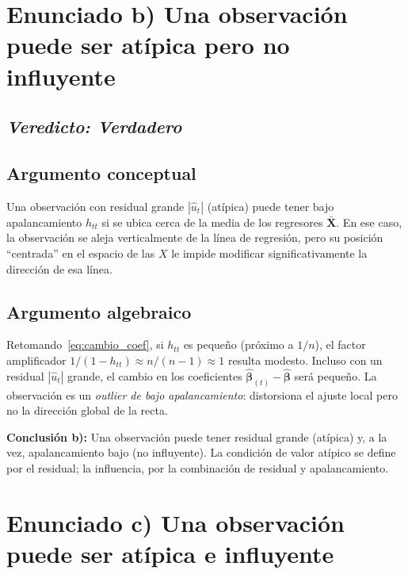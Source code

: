 \documentclass[12pt, letterpaper]{article}
\begin{document}
\section{Enunciado b) Una observación puede ser atípica pero no influyente}

\subsection*{\textit{Veredicto: \textbf{Verdadero}}}

\subsection{Argumento conceptual}

Una observación con residual grande $|\hat{u}_t|$ (atípica) puede tener
bajo apalancamiento $h_{tt}$ si se ubica cerca de la media de los
regresores $\bar{\mathbf{X}}$. En ese caso, la observación se aleja
verticalmente de la línea de regresión, pero su posición ``centrada''
en el espacio de las $X$ le impide modificar significativamente la
dirección de esa línea.

\subsection{Argumento algebraico}

Retomando~\eqref{eq:cambio_coef}, si $h_{tt}$ es pequeño (próximo a
$1/n$), el factor amplificador $1/(1 - h_{tt}) \approx n/(n-1) \approx 1$
resulta modesto. Incluso con un residual $|\hat{u}_t|$ grande, el cambio
en los coeficientes $\hat{\boldsymbol{\beta}}_{(t)} - \hat{\boldsymbol{\beta}}$
será pequeño. La observación es un \emph{outlier de bajo apalancamiento}:
distorsiona el ajuste local pero no la dirección global de la recta.

\begin{clave}
  \textbf{Conclusión b):} Una observación puede tener residual grande
  (atípica) y, a la vez, apalancamiento bajo (no influyente). La
  condición de valor atípico se define por el residual; la influencia,
  por la combinación de residual y apalancamiento.
\end{clave}

\section{Enunciado c) Una observación puede ser atípica e influyente}
\end{document}
